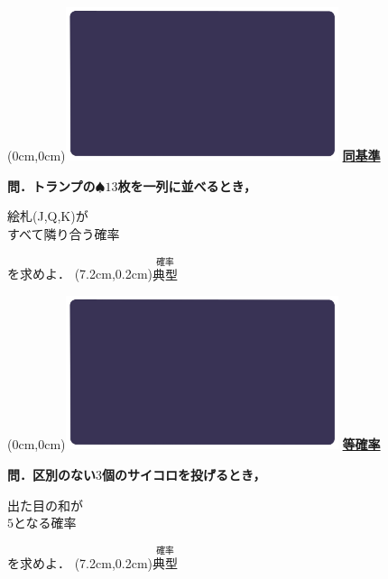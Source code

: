 \documentclass[10pt,
fleqn,
dvipdfmx,
uplatex
]{jsarticle}
\begin{document}
\newpage

\at(0cm,0cm){\includegraphics[width=8cm,bb=0 0 1920 1080]{./youtube/thumbnails/templates/smart_background/確率.jpeg}}
{\color{orange}\bf\boldmath\huge\underline{同基準}}\vspace{0.3zw}

\normalsize 
\bf\boldmath 問．トランプの$\spadesuit$${13}$枚を一列に並べるとき，

\huge 
絵札(J,Q,K)が\\
\hfill すべて隣り合う確率

\normalsize
\hfill を求めよ．
\at(7.2cm,0.2cm){\small\color{bradorange}$\overset{\text{確率}}{\text{典型}}$}

\newpage

\at(0cm,0cm){\includegraphics[width=8cm,bb=0 0 1920 1080]{./youtube/thumbnails/templates/smart_background/確率.jpeg}}
{\color{orange}\bf\boldmath\huge\underline{等確率}}\vspace{0.3zw}

\normalsize 
\bf\boldmath 問．区別のない$3$個のサイコロを投げるとき，

\Huge 
\vspace{-0.2zw}
出た目の和が\vspace{-0.2zw}\\
\hfill $5$となる確率

\normalsize
\vspace{0.2zw}
\hfill を求めよ．
\at(7.2cm,0.2cm){\small\color{bradorange}$\overset{\text{確率}}{\text{典型}}$}

\newpage
\end{document}
